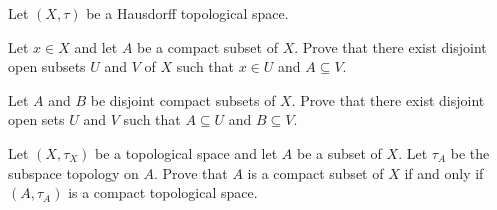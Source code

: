 \item Let $(X, \tau)$ be a Hausdorff topological space.

\ba

\item Let $x \in X$ and let $A$ be a compact subset of $X$. Prove that there exist disjoint open subsets $U$ and $V$ of $X$ such that $x \in U$ and $A \subseteq V$. 

\item Let $A$ and $B$ be disjoint compact subsets of $X$. Prove that there exist disjoint open sets $U$ and $V$ such that $A \subseteq U$ and $B \subseteq V$. 

\ea

\begin{comment}

\ExerciseSolution 

\ba

\item Let $a \in A$. Since $X$ is Hausdorff, there exist disjoint open sets $O_{x_a}$ and $O_a$ such that $x \in O_{x_a}$ and $a \in O_a$. Now $\{O_a\}_{a \in A}$ is an open cover of $A$. Since $A$ is compact, there is a finite subcover $\{O_{a_i}\}_{1 \leq i \leq n}$ for $A$ of $\{O_a\}_{a \in A}$. Let $V = \bigcup_{i=1}^n O_{a_i}$. Then $V$ is an open set and $A \subseteq V$. Now let $U = \bigcap_{i=1}^n O_{x_{a_i}}$. As a finite intersection of open sets, we know that $U$ is an open set. The fact that $x \in O_{a_i}$ for each $i$ means that $x \in U$. To complete our proof, we will demonstrate that $U \cap V = \emptyset$. Suppose $z \in U \cap V$. Since $z \in V$, there is an integer $k$ such that $z \in O_{a_k}$. Because $z in U$, we know that $z \in O_{x_{a_k}}$, But $O_{x_{a_k}} \cap O_{a_k} = \emptyset$. We conclude that $U \cap V = \emptyset$.  


\item By part (a), for each $b \in B$ there exists open sets $U_b$ and $V_b$ such that $A \subseteq U_b$ and $b \in V_b$. The collection $\{V_b\}_{b \in B}$ is an open cover of $B$. Because $B$ is compact, there is a finite subcover $\{V_{b_i}\}{1 \leq i \leq n}$ for $B$. As in part (a) the sets $V = \bigcup_{i=1}^n V_{b_i}$ and $U = \bigcap_{i=1}^n U_{b_i}$ are disjoint, and $A \subseteq U$ and $B \subseteq V$.  

\ea

\end{comment}

\item \label{ex:subspace_compact} Let $(X,\tau_X)$ be a topological space and let $A$ be a subset of $X$. Let $\tau_A$ be the subspace topology on $A$. Prove that $A$ is a compact subset of $X$ if and only if $(A, \tau_A)$ is a compact topological space. 

